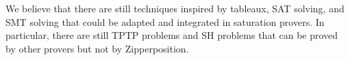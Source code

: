 \documentclass[smallcondensed,draft]{svjour3}     %
\def\orcid#1{{\href{http://orcid.org/#1}{\protect\raisebox{-1.25pt}{\protect\texttt{[image: orcid.pdf]}}}}}
\begin{document}
We believe that there are still techniques inspired by
tableaux, SAT solving, and SMT solving that could be adapted and integrated in
saturation provers. In particular, there are still  TPTP problems
and  SH problems that can be proved by other provers but not by
Zipperposition.





% 
\usepackage{flushend}
\usepackage{cite}
\usepackage{etoolbox}
\usepackage{dcolumn}
\usepackage{algorithmicx}
\usepackage{regexpatch}
\usepackage{algorithm}%
\usepackage[noend]{algpseudocode}%
\usepackage[mathscr]{eucal}
\usepackage{prftree}
\usepackage[utf8]{inputenc}
\usepackage{enumerate}
\usepackage{graphicx}
\usepackage{cite}
\usepackage{tikz}
\usepackage{pgfplots} 
\usepackage{amsmath}
\usepackage{amssymb}
\usepackage{booktabs}
\usepackage[nomessages]{fp}
\usepackage{enumerate}

\usepackage{mathptmx}
\usepackage[scaled=.82]{beramono}
\usepackage[scaled=.865]{helvet}


\end{document}
